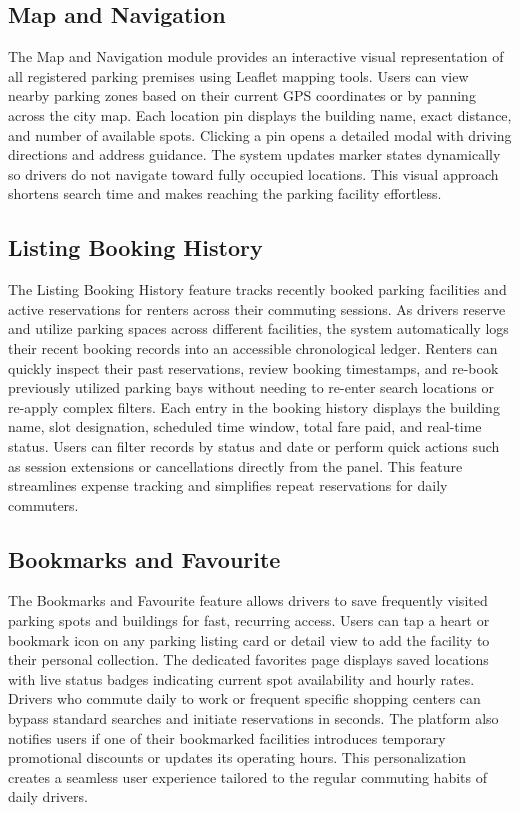 \documentclass[12pt,a4paper]{article}
\begin{document}
\subsection{Map and Navigation}
The Map and Navigation module provides an interactive visual representation of all registered parking premises using Leaflet mapping tools. Users can view nearby parking zones based on their current GPS coordinates or by panning across the city map. Each location pin displays the building name, exact distance, and number of available spots. Clicking a pin opens a detailed modal with driving directions and address guidance. The system updates marker states dynamically so drivers do not navigate toward fully occupied locations. This visual approach shortens search time and makes reaching the parking facility effortless.

\subsection{Listing Booking History}
The Listing Booking History feature tracks recently booked parking facilities and active reservations for renters across their commuting sessions. As drivers reserve and utilize parking spaces across different facilities, the system automatically logs their recent booking records into an accessible chronological ledger. Renters can quickly inspect their past reservations, review booking timestamps, and re-book previously utilized parking bays without needing to re-enter search locations or re-apply complex filters. Each entry in the booking history displays the building name, slot designation, scheduled time window, total fare paid, and real-time status. Users can filter records by status and date or perform quick actions such as session extensions or cancellations directly from the panel. This feature streamlines expense tracking and simplifies repeat reservations for daily commuters.

\subsection{Bookmarks and Favourite}
The Bookmarks and Favourite feature allows drivers to save frequently visited parking spots and buildings for fast, recurring access. Users can tap a heart or bookmark icon on any parking listing card or detail view to add the facility to their personal collection. The dedicated favorites page displays saved locations with live status badges indicating current spot availability and hourly rates. Drivers who commute daily to work or frequent specific shopping centers can bypass standard searches and initiate reservations in seconds. The platform also notifies users if one of their bookmarked facilities introduces temporary promotional discounts or updates its operating hours. This personalization creates a seamless user experience tailored to the regular commuting habits of daily drivers.
\end{document}
